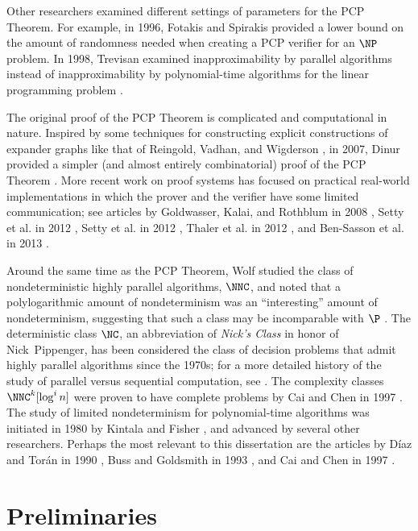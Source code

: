 Other researchers examined different settings of parameters for the PCP Theorem.
For example, in 1996, Fotakis and Spirakis \autocite{fs96} provided a lower bound on the amount of randomness needed when creating a PCP verifier for an $\NP$ problem.
In 1998, Trevisan examined inapproximability by parallel algorithms instead of inapproximability by polynomial-time algorithms for the linear programming problem \autocite{trevisan98}.

The original proof of the PCP Theorem is complicated and computational in nature.
Inspired by some techniques for constructing explicit constructions of expander graphs like that of Reingold, Vadhan, and Wigderson \autocite{rvw00}, in 2007, Dinur provided a simpler (and almost entirely combinatorial) proof of the PCP Theorem \autocite{dinur07}.
More recent work on proof systems has focused on practical real-world implementations in which the prover and the verifier have some limited communication; see articles by
Goldwasser, Kalai, and Rothblum in 2008 \autocite{gkr08},
Setty et al. in 2012 \autocite{smbw12},
Setty et al. in 2012 \autocite{svpbbw12},
Thaler et al. in 2012 \autocite{trmp12},
and Ben-Sasson et al. in 2013 \autocite{bcgt13}.

Around the same time as the PCP Theorem, Wolf studied the class of nondeterministic highly parallel algorithms, $\NNC$, and noted that a polylogarithmic amount of nondeterminism was an ``interesting'' amount of nondeterminism, suggesting that such a class may be incomparable with $\P$ \autocite{wolf94}.
The deterministic class $\NC$, an abbreviation of \emph{Nick's Class} in honor of Nick~Pippenger, has been considered the class of decision problems that admit highly parallel algorithms since the 1970s; for a more detailed history of the study of parallel versus sequential computation, see \autocite[Section~1.3]{ghr95}.
The complexity classes $\NNC^k[\log^i n]$ were proven to have complete problems by Cai and Chen in 1997 \autocite{cc97lim}.
The study of limited nondeterminism for polynomial-time algorithms was initiated in 1980 by Kintala and Fisher \autocite{kf80}, and advanced by several other researchers. Perhaps the most relevant to this dissertation are the articles by Díaz and Torán in 1990 \autocite{dt90}, Buss and Goldsmith in 1993 \autocite{bg93}, and Cai and Chen in 1997 \autocite{cc97lim}.

\section{Preliminaries}

